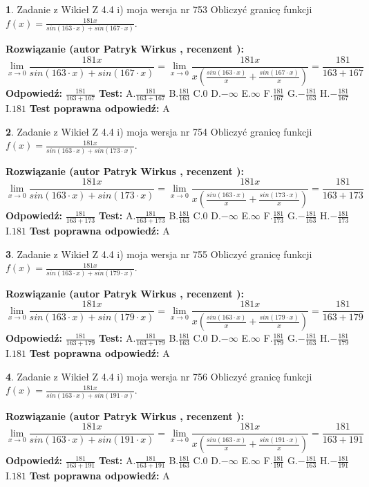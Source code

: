 \documentclass[12pt, a4paper]{article}
\theoremstyle{definition} %
\newtheorem{zad}{}
\newcommand{\zadStart}[1]{\begin{zad}#1\newline}
\newcommand{\zadStop}{\end{zad}}
\newcommand{\rozwStart}[2]{\noindent \textbf{Rozwiązanie (autor #1 , recenzent #2): }\newline}
\newcommand{\rozwStop}{\newline}
\newcommand{\odpStart}{\noindent \textbf{Odpowiedź:}\newline}
\newcommand{\odpStop}{\newline}
\newcommand{\testStart}{\noindent \textbf{Test:}\newline}
\newcommand{\testStop}{\newline}
\newcommand{\kluczStart}{\noindent \textbf{Test poprawna odpowiedź:}\newline}
\newcommand{\kluczStop}{\newline}
\begin{document}
\zadStart{Zadanie z Wikieł Z 4.4 i) moja wersja nr 753}
Obliczyć granicę funkcji $f(x)=\frac{181x}{sin(163\cdot x) +sin(167\cdot x)}$.
\zadStop
\rozwStart{Patryk Wirkus}{}
$$\lim\limits_{x\to 0}\frac{181x}{sin(163\cdot x) +sin(167\cdot x)}=\lim\limits_{x\to 0}\frac{181x}{x(\frac{sin(163\cdot x)}{x}+\frac{sin(167\cdot x)}{x})}=\frac{181}{163+167}$$
\rozwStop
\odpStart
$\frac{181}{163+167}$
\odpStop
\testStart
A.$\frac{181}{163+167}$
B.$\frac{181}{163}$
C.$0$
D.$-\infty$
E.$\infty$
F.$\frac{181}{167}$
G.$-\frac{181}{163}$
H.$-\frac{181}{167}$
I.$181$
\testStop
\kluczStart
A
\kluczStop



\zadStart{Zadanie z Wikieł Z 4.4 i) moja wersja nr 754}
Obliczyć granicę funkcji $f(x)=\frac{181x}{sin(163\cdot x) +sin(173\cdot x)}$.
\zadStop
\rozwStart{Patryk Wirkus}{}
$$\lim\limits_{x\to 0}\frac{181x}{sin(163\cdot x) +sin(173\cdot x)}=\lim\limits_{x\to 0}\frac{181x}{x(\frac{sin(163\cdot x)}{x}+\frac{sin(173\cdot x)}{x})}=\frac{181}{163+173}$$
\rozwStop
\odpStart
$\frac{181}{163+173}$
\odpStop
\testStart
A.$\frac{181}{163+173}$
B.$\frac{181}{163}$
C.$0$
D.$-\infty$
E.$\infty$
F.$\frac{181}{173}$
G.$-\frac{181}{163}$
H.$-\frac{181}{173}$
I.$181$
\testStop
\kluczStart
A
\kluczStop



\zadStart{Zadanie z Wikieł Z 4.4 i) moja wersja nr 755}
Obliczyć granicę funkcji $f(x)=\frac{181x}{sin(163\cdot x) +sin(179\cdot x)}$.
\zadStop
\rozwStart{Patryk Wirkus}{}
$$\lim\limits_{x\to 0}\frac{181x}{sin(163\cdot x) +sin(179\cdot x)}=\lim\limits_{x\to 0}\frac{181x}{x(\frac{sin(163\cdot x)}{x}+\frac{sin(179\cdot x)}{x})}=\frac{181}{163+179}$$
\rozwStop
\odpStart
$\frac{181}{163+179}$
\odpStop
\testStart
A.$\frac{181}{163+179}$
B.$\frac{181}{163}$
C.$0$
D.$-\infty$
E.$\infty$
F.$\frac{181}{179}$
G.$-\frac{181}{163}$
H.$-\frac{181}{179}$
I.$181$
\testStop
\kluczStart
A
\kluczStop



\zadStart{Zadanie z Wikieł Z 4.4 i) moja wersja nr 756}
Obliczyć granicę funkcji $f(x)=\frac{181x}{sin(163\cdot x) +sin(191\cdot x)}$.
\zadStop
\rozwStart{Patryk Wirkus}{}
$$\lim\limits_{x\to 0}\frac{181x}{sin(163\cdot x) +sin(191\cdot x)}=\lim\limits_{x\to 0}\frac{181x}{x(\frac{sin(163\cdot x)}{x}+\frac{sin(191\cdot x)}{x})}=\frac{181}{163+191}$$
\rozwStop
\odpStart
$\frac{181}{163+191}$
\odpStop
\testStart
A.$\frac{181}{163+191}$
B.$\frac{181}{163}$
C.$0$
D.$-\infty$
E.$\infty$
F.$\frac{181}{191}$
G.$-\frac{181}{163}$
H.$-\frac{181}{191}$
I.$181$
\testStop
\kluczStart
A
\kluczStop
\end{document}
